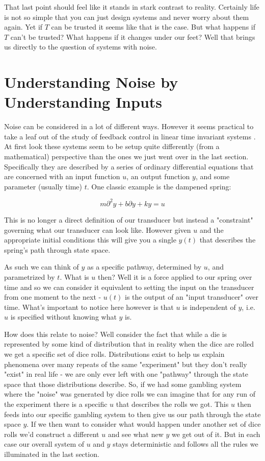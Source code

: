 \documentclass[11pt,a5paper]{article}
\begin{document}
That last point should feel like it stands in stark contrast to reality. Certainly life is not so simple that you can just design systems and never worry about them again. Yet if $T$ can be trusted it seems like that is the case. But what happens if $T$ can't be trusted? What happens if it changes under our feet? Well that brings us directly to the question of systems with noise.  

\newpage


\section{Understanding Noise by Understanding Inputs}

Noise can be considered in a lot of different ways. However it seems practical to take a leaf out of the study of feedback control in linear time invariant systems \cite{feedback}. At first look these systems seem to be setup quite differently (from a mathematical) perspective than the ones we just went over in the last section. Specifically they are described by a series of ordinary differential equations that are concerned with an input function $u$, an output function $y$, and some parameter (usually time) $t$. One classic example is the dampened spring:

$$m\partial^2y+b\partial y+ky=u$$

This is no longer a direct definition of our transducer but instead a "constraint" governing what our transducer can look like. However given $u$ and the appropriate initial conditions this will give you a single $y(t)$ that describes the spring's path through state space. 

As such we can think of $y$ as a specific pathway, determined by $u$, and parametrized by $t$. What is $u$ then? Well it is a force applied to our spring over time and so we can consider it equivalent to setting the input on the transducer from one moment to the next - $u(t)$ is the output of an "input transducer" over time. What's important to notice here however is that $u$ is independent of $y$, i.e. $u$ is specified without knowing what $y$ is.\newline

How does this relate to noise? Well consider the fact that while a die is represented by some kind of distribution that in reality when the dice are rolled we get a specific set of dice rolls. Distributions exist to help us explain phenomena over many repeats of the same "experiment" but they don't really "exist" in real life - we are only ever left with one "pathway" through the state space that those distributions describe. So, if we had some gambling system where the "noise" was generated by dice rolls we can imagine that for any run of the experiment there is a specific $u$ that describes the rolls we got. This $u$ then feeds into our specific gambling system to then give us our path through the state space $y$. If we then want to consider what would happen under another set of dice rolls we'd construct a different $u$ and see what new $y$ we get out of it. But in each case our overall system of $u$ and $y$ stays deterministic and follows all the rules we illuminated in the last section. 
\end{document}

